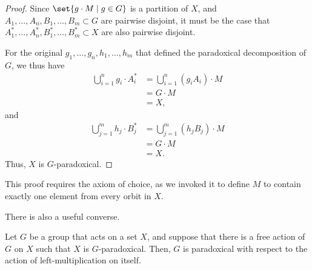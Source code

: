 \documentclass[10pt]{mypackage2}
\begin{document}
\begin{proof}
  Since $\set{g\cdot M\mid g\in G}$ is a partition of $X$, and $A_1,\dots,A_n,B_1,\dots,B_m\subset G$ are pairwise disjoint, it must be the case that $A_1^{\ast},\dots,A_n^{\ast},B_1^{\ast},\dots,B_m^{\ast}\subset X$ are also pairwise disjoint.\newline

  For the original $g_1,\dots,g_n,h_1,\dots,h_m$ that defined the paradoxical decomposition of $G$, we thus have
  \begin{align*}
    \bigcup_{i=1}^{n}g_i\cdot A_i^{\ast} &= \bigcup_{i=1}^{n}\left(g_iA_i\right)\cdot M\\
                                         &= G\cdot M\\
                                         &= X,
  \end{align*}
  and
  \begin{align*}
    \bigcup_{j=1}^{m}h_j\cdot B_j^{\ast} &= \bigcup_{j=1}^{m}\left(h_jB_j\right)\cdot M\\
                                         &= G\cdot M\\
                                         &= X.
  \end{align*}
  Thus, $X$ is $G$-paradoxical.
\end{proof}
\begin{remark}
  This proof requires the axiom of choice, as we invoked it to define $M$ to contain exactly one element from every orbit in $X$.
\end{remark}
There is also a useful converse.
\begin{proposition}\label{prop:paradoxical_action_paradoxical_group}
  Let $G$ be a group that acts on a set $X$, and suppose that there is a free action of $G$ on $X$ such that $X$ is $G$-paradoxical. Then, $G$ is paradoxical with respect to the action of left-multiplication on itself.
\end{proposition}
\end{document}

